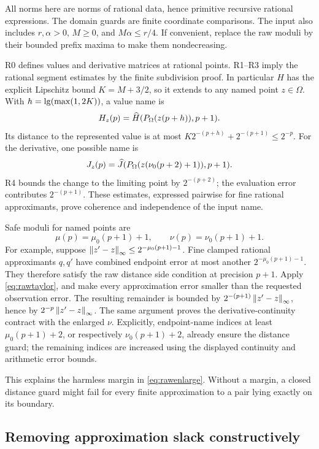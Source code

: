 All norms here are norms of rational data, hence primitive
recursive rational expressions. The domain guards are finite
coordinate comparisons. The input also includes \(r,\alpha>0\),
\(M\ge0\), and \(M\alpha\le r/4\).
If convenient, replace the raw moduli by their bounded prefix
maxima to make them nondecreasing.

R0 defines values and derivative matrices at rational points.
R1--R3 imply the rational segment estimates by the finite
subdivision proof. In particular \(H\) has the explicit
Lipschitz bound \(K=M+3/2\), so it extends to any named point
\(z\in\Omega\). With \(h=\operatorname{lg}(\max(1,2K))\), a value name is
\[
 H_z(p)=\widehat H(P_\Omega(z(p+h)),p+1).
\]
Its distance to the represented value is at most
\(K2^{-(p+h)}+2^{-(p+1)}\le2^{-p}\).
For the derivative, one possible name is
\[
 J_z(p)=
 \widehat J(P_\Omega(z(\nu_0(p+2)+1)),p+1).
\]
R4 bounds the change to the limiting point by \(2^{-(p+2)}\);
the evaluation error contributes \(2^{-(p+1)}\).
These estimates, expressed pairwise for fine rational
approximants, prove coherence and independence of the input
name.

Safe moduli for named points are
\begin{equation}\label{eq:rawenlarge}
 \mu(p)=\mu_0(p+1)+1,\qquad
 \nu(p)=\nu_0(p+1)+1.
\end{equation}
For example, suppose
\(\left\lVert z'-z\right\rVert_\infty\le2^{-\mu_0(p+1)-1}\).
Fine clamped rational approximants \(q,q'\) have combined
endpoint error at most another
\(2^{-\mu_0(p+1)-1}\). They therefore satisfy the raw
distance side condition at precision \(p+1\).
Apply \eqref{eq:rawtaylor}, and make every approximation error
smaller than the requested observation error. The resulting
remainder is bounded by \(2^{-(p+1)}\left\lVert z'-z\right\rVert_\infty\), hence
by \(2^{-p}\left\lVert z'-z\right\rVert_\infty\).
The same argument proves the derivative-continuity contract
with the enlarged \(\nu\). Explicitly, endpoint-name indices
at least \(\mu_0(p+1)+2\), or respectively
\(\nu_0(p+1)+2\), already ensure the distance guard; the
remaining indices are increased using the displayed
continuity and arithmetic error bounds.

This explains the harmless margin in \eqref{eq:rawenlarge}.
Without a margin, a closed distance guard might fail for
every finite approximation to a pair lying exactly on its
boundary.

\subsection{Removing approximation slack constructively}

